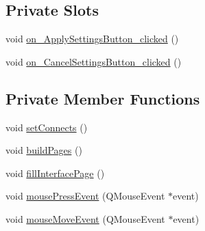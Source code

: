 \subsection*{Private Slots}
\begin{DoxyCompactItemize}
\item 
void \hyperlink{classMattySettingsDialog_a8865f6098ec5170a9b2883827e5f7d1d}{on\+\_\+\+Apply\+Settings\+Button\+\_\+clicked} ()
\item 
void \hyperlink{classMattySettingsDialog_afac985297c5a7a526a036b84ce99e606}{on\+\_\+\+Cancel\+Settings\+Button\+\_\+clicked} ()
\end{DoxyCompactItemize}
\subsection*{Private Member Functions}
\begin{DoxyCompactItemize}
\item 
void \hyperlink{classMattySettingsDialog_a4e0c6d5ea1b0a3a40a0f856386c21bce}{set\+Connects} ()
\item 
void \hyperlink{classMattySettingsDialog_a92444461b31265858791d279e483069d}{build\+Pages} ()
\item 
void \hyperlink{classMattySettingsDialog_a4c8eaeb364e8fa94fe89fdbe2eb822b5}{fill\+Interface\+Page} ()
\item 
void \hyperlink{classMattySettingsDialog_aa3af114eb9192cf2ce488194bb30b761}{mouse\+Press\+Event} (Q\+Mouse\+Event $\ast$event)
\item 
void \hyperlink{classMattySettingsDialog_a87e407b4afdfc3b255c4b5de1699349d}{mouse\+Move\+Event} (Q\+Mouse\+Event $\ast$event)
\end{DoxyCompactItemize}
